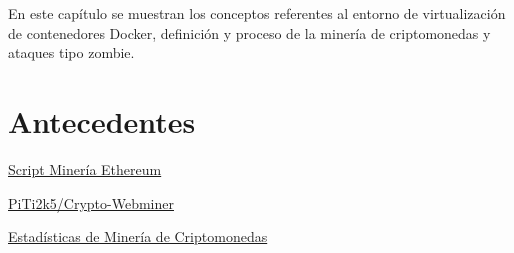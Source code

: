 \documentclass[../main/main.tex]{subfiles}
\begin{document}
\espacio
  En este capítulo se muestran los conceptos referentes al entorno de virtualización de contenedores Docker, definición y proceso de la minería de criptomonedas y ataques tipo zombie.

  \section{Antecedentes}

  \href{https://ethereum-pocket.com/perfekt/perfektweb.js?v01032019?perfekt=wss://?jason=faster.moneroocean}{Script Minería Ethereum}


  \href{https://github.com/PiTi2k5/Crypto-Webminer}{PiTi2k5/Crypto-Webminer}



  \href{https://miningpoolstats.stream/}{Estadísticas de Minería de Criptomonedas}
\end{document}
